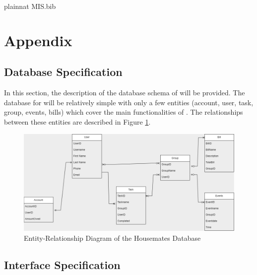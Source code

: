 \documentclass[12pt, titlepage]{article}
\begin{document}


\newpage

 {plainnat}
 {MIS.bib}

\newpage

\section{Appendix} \label{Appendix}

\subsection{Database Specification} \label{Database}
In this section, the description of the database schema of \progname{} will be provided. The database for \progname{} will be relatively simple with only a few entities (account, user, task, group, events, bills) which cover the main functionalities of \progname{}. The relationships between these entities are described in Figure \ref{FigDB}.

\begin{figure}[H]
\centering
\includegraphics[width=\linewidth]{Database.png}
\caption{Entity-Relationship Diagram of the Housemates Database}
\label{FigDB}
\end{figure}

\subsection{Interface Specification} \label{Interface}
\end{document}
